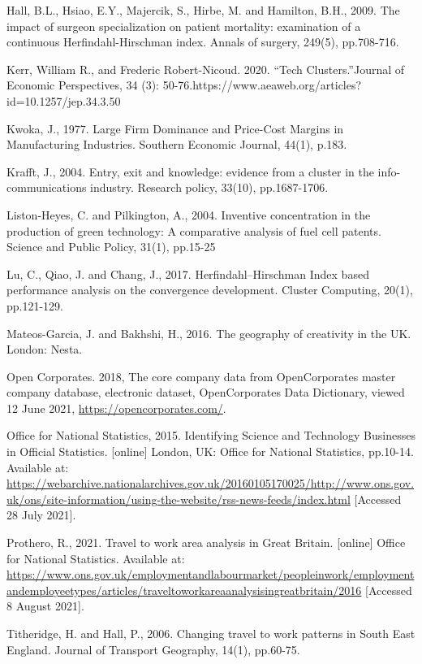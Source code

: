 \documentclass[
  12pt,
  oneside]{book}
\begin{document}
Hall, B.L., Hsiao, E.Y., Majercik, S., Hirbe, M. and Hamilton, B.H., 2009. The impact of surgeon specialization on patient mortality: examination of a continuous Herfindahl-Hirschman index. Annals of surgery, 249(5), pp.708-716.

Kerr, William R., and Frederic Robert-Nicoud. 2020. ``Tech Clusters.''Journal of Economic Perspectives, 34 (3): 50-76.https://www.aeaweb.org/articles?id=10.1257/jep.34.3.50

Kwoka, J., 1977. Large Firm Dominance and Price-Cost Margins in Manufacturing Industries. Southern Economic Journal, 44(1), p.183.

Krafft, J., 2004. Entry, exit and knowledge: evidence from a cluster in the info-communications industry. Research policy, 33(10), pp.1687-1706.

Liston-Heyes, C. and Pilkington, A., 2004. Inventive concentration in the production of green technology: A comparative analysis of fuel cell patents. Science and Public Policy, 31(1), pp.15-25

Lu, C., Qiao, J. and Chang, J., 2017. Herfindahl--Hirschman Index based performance analysis on the convergence development. Cluster Computing, 20(1), pp.121-129.

Mateos-Garcia, J. and Bakhshi, H., 2016. The geography of creativity in the UK. London: Nesta.

Open Corporates. 2018, The core company data from OpenCorporates master company database, electronic dataset, OpenCorporates Data Dictionary, viewed 12 June 2021, \url{https://opencorporates.com/}.

Office for National Statistics, 2015. Identifying Science and Technology Businesses in Official Statistics. {[}online{]} London, UK: Office for National Statistics, pp.10-14. Available at: \url{https://webarchive.nationalarchives.gov.uk/20160105170025/http://www.ons.gov.uk/ons/site-information/using-the-website/rss-news-feeds/index.html} {[}Accessed 28 July 2021{]}.

Prothero, R., 2021. Travel to work area analysis in Great Britain. {[}online{]} Office for National Statistics. Available at: \url{https://www.ons.gov.uk/employmentandlabourmarket/peopleinwork/employmentandemployeetypes/articles/traveltoworkareaanalysisingreatbritain/2016} {[}Accessed 8 August 2021{]}.

Titheridge, H. and Hall, P., 2006. Changing travel to work patterns in South East England. Journal of Transport Geography, 14(1), pp.60-75.

\printbibliography
\end{document}
